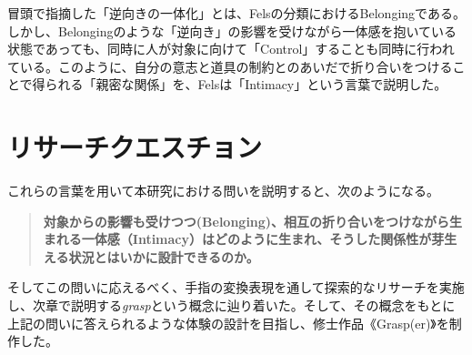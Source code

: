 

冒頭で指摘した「逆向きの一体化」とは、Felsの分類におけるBelongingである。しかし、Belongingのような「逆向き」の影響を受けながら一体感を抱いている状態であっても、同時に人が対象に向けて「Control」することも同時に行われている。このように、自分の意志と道具の制約とのあいだで折り合いをつけることで得られる「親密な関係」を、Felsは「Intimacy」という言葉で説明した。

\section{リサーチクエスチョン}

これらの言葉を用いて本研究における問いを説明すると、次のようになる。

\begin{quote}
\textbf{対象からの影響も受けつつ(Belonging)、相互の折り合いをつけながら生まれる一体感（Intimacy）はどのように生まれ、そうした関係性が芽生える状況とはいかに設計できるのか。}
\end{quote}

そしてこの問いに応えるべく、手指の変換表現を通して探索的なリサーチを実施し、次章で説明する\textit{grasp}という概念に辿り着いた。そして、その概念をもとに上記の問いに答えられるような体験の設計を目指し、修士作品《Grasp(er)》を制作した。

